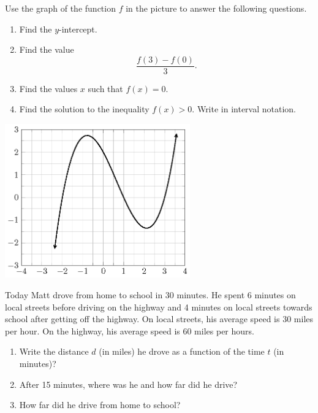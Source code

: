 \documentclass[en,12pt]{elegantbook}
\providecommand{\tightlist}{%
  \setlength{\itemsep}{0pt}\setlength{\parskip}{0pt}}
\let\BeginKnitrBlock\begin \let\EndKnitrBlock\end
\begin{document}
\BeginKnitrBlock{exercise}
\protect\hypertarget{exr:unnamed-chunk-255}{}{\label{exr:unnamed-chunk-255} }
Use the graph of the function \(f\) in the picture to answer the following questions.

\begin{enumerate}
\def\labelenumi{\arabic{enumi}.}
\tightlist
\item
  Find the \(y\)-intercept.
\item
  Find the value
  \[\dfrac{f(3)-f(0)}{3}.\]
\item
  Find the values \(x\) such that \(f(x)=0\).
\item
  Find the solution to the inequality \(f(x)>0\). Write in interval notation.
\end{enumerate}

\includegraphics[width=0.6\textwidth,height=\textheight]{figs/function-exercise-cubic.png}\\
\EndKnitrBlock{exercise}

\BeginKnitrBlock{exercise}
\protect\hypertarget{exr:unnamed-chunk-256}{}{\label{exr:unnamed-chunk-256} }
Today Matt drove from home to school in 30 minutes. He spent 6 minutes on local streets before driving on the highway and 4 minutes on local streets towards school after getting off the highway. On local streets, his average speed is 30 miles per hour. On the highway, his average speed is 60 miles per hours.

\begin{enumerate}
\def\labelenumi{\arabic{enumi}.}
\tightlist
\item
  Write the distance \(d\) (in miles) he drove as a function of the time \(t\) (in minutes)?
\item
  After 15 minutes, where was he and how far did he drive?
\item
  How far did he drive from home to school?
\end{enumerate}
\EndKnitrBlock{exercise}
\end{document}
